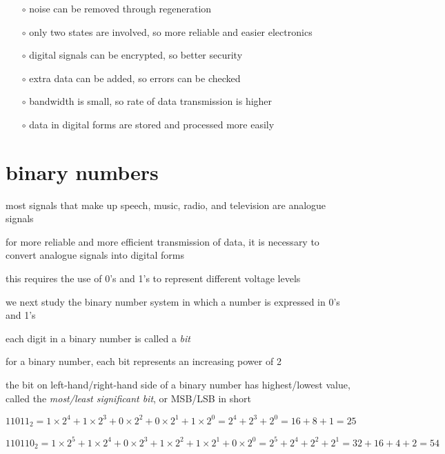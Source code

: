 \begin{itemize}[leftmargin=\parindent]
	\item[$\circ$] noise can be removed through regeneration
	
	\item[$\circ$] only two states are involved, so more reliable and easier electronics
	
	\item[$\circ$] digital signals can be encrypted, so better security
	
	\item[$\circ$] extra data can be added, so errors can be checked
	
	\item[$\circ$] bandwidth is small, so rate of data transmission is higher
	
	\item[$\circ$] data in digital forms are stored and processed more easily
	
\end{itemize}



\section{binary numbers}

most signals that make up speech, music, radio, and television are analogue signals

for more reliable and more efficient transmission of data, it is necessary to convert analogue signals into digital forms

this requires the use of 0's and 1's to represent different voltage levels

we next study the binary number system in which a number is expressed in 0's and 1's

\cmt each digit in a binary number is called a \emph{bit}

\cmt for a binary number, each bit represents an increasing power of 2

the bit on left-hand/right-hand side of a binary number has highest/lowest value, called the \emph{most/least significant bit}, or MSB/LSB in short


\sol $11011_2 = 1\times2^4 + 1\times2^3 + 0\times2^2 + 0\times2^1 + 1\times2^0 = 2^4 + 2^3 + 2^0 = 16 + 8 + 1 = 25$

$110110_2 = 1 \times 2^5 + 1\times2^4 + 0\times2^3 + 1\times2^2 + 1\times2^1 + 0\times2^0 = 2^5 + 2^4 + 2^2 + 2^1 = 32 + 16 + 4 + 2 = 54$ \eoe

